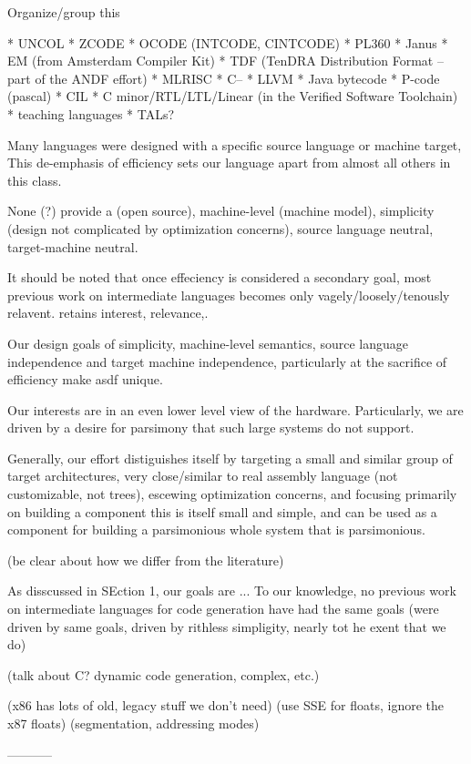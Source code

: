 Organize/group this

* UNCOL
* ZCODE
* OCODE (INTCODE, CINTCODE)
* PL360
* Janus
* EM (from Amsterdam Compiler Kit)
* TDF (TenDRA Distribution Format -- part of the ANDF effort)
* MLRISC
* C--
* LLVM
* Java bytecode
* P-code (pascal)
* CIL
* C minor/RTL/LTL/Linear (in the Verified Software Toolchain)
* teaching languages
* TALs?

Many languages were designed with a specific source language or machine target,
This de-emphasis of efficiency sets our language apart from almost all others in this class.

None (?) provide a (open source), machine-level (machine model),
simplicity (design not complicated by optimization concerns),
source language neutral,
target-machine neutral.

It should be noted that once effeciency is considered
a secondary goal, most previous work on intermediate languages
becomes only vagely/loosely/tenously relavent. retains
interest, relevance,.

Our design goals of simplicity, machine-level semantics, source language
independence and target machine independence, particularly at the sacrifice
of efficiency make asdf unique.

Our interests
are in an even lower level view of the hardware. Particularly, we are driven by a desire for
parsimony that such large systems do not support.

Generally, our effort distiguishes itself by targeting a small and similar group of target
architectures, very close/similar to real assembly language (not customizable, not trees), escewing optimization concerns,
and focusing primarily on building a component
this is itself small and simple, and can be used as a component for building a parsimonious
whole system that is parsimonious.

(be clear about how we differ from the literature)

As disscussed in SEction 1, our goals are ... To our knowledge, no previous
work on intermediate languages for code generation have had the same goals
(were driven by same goals, driven by rithless simpligity, nearly tot he exent that
we do)

(talk about C? dynamic code generation, complex, etc.)

(x86 has lots of old, legacy stuff we don't need)
(use SSE for floats, ignore the x87 floats)
(segmentation, addressing modes)

-----------

